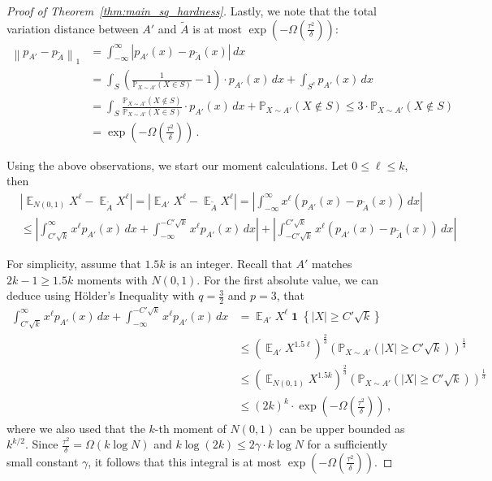 \documentclass{theoretics}
\newcommand{\paren}[1]{(#1)}
\newcommand{\Paren}[1]{\left(#1\right)}
\newcommand{\Abs}[1]{\left\lvert#1\right\rvert}
\newcommand{\Set}[1]{\left\{#1\right\}}
\newcommand{\Norm}[1]{\left\lVert#1\right\rVert}
\newcommand{\Esymb}{\mathbb{E}}
\newcommand{\Psymb}{\mathbb{P}}
\DeclareMathOperator*{\E}{\Esymb}
\DeclareMathOperator{\Ind}{\mathbf 1}
\renewcommand{\leq}{\leqslant}
\renewcommand{\geq}{\geqslant}
\begin{document}
\begin{proof}[Proof of Theorem~\ref{thm:main_sq_hardness}]
    Lastly, we note that the total variation distance between $A'$ and $\tilde{A}$ is at most $\exp(-\Omega(\tfrac{\tau^2}\delta))$:
    \begin{align*}
        \Norm{p_{A'} - p_{\tilde{A}}}_1 &= \int_{-\infty}^\infty \Abs{p_{A'}(x) - p_{\tilde{A}}(x)} \, dx \\
        &= \int_S \Paren{\frac 1 {\Psymb_{X \sim A'}(X \in S)} - 1} \cdot p_{A'}(x) \, dx + \int_{S^c} p_{A'}(x) \, dx \\
        &= \int_S \frac {\Psymb_{X \sim A'}(X \not\in S)} {\Psymb_{X \sim A'}(X \in S)} \cdot p_{A'}(x) \, dx + \Psymb_{X \sim A'}(X \not\in S) \leq 3\cdot\Psymb_{X \sim A'}(X \not\in S)  \\
        &= \exp\Paren{-\Omega\Paren{\frac{\tau^2} \delta}} \,.
    \end{align*}
    
    Using the above observations, we start our moment calculations.
    Let $0 \leq \ell \leq k$, then
    \begin{align*}
        &\Abs{\E_{N(0,1)} X^\ell - \E_{\tilde{A}} X^\ell} = \Abs{\E_{A'} X^\ell - \E_{\tilde{A}} X^\ell} = \Abs{\int_{-\infty}^\infty x^\ell (p_{A'}(x) - p_{\tilde{A}}(x)) \, dx} \\
        &\leq \Abs{\int_{C'\sqrt{k}}^{\infty} x^\ell p_{A'}(x) \, dx + \int_{-\infty}^{-C'\sqrt{k}} x^\ell p_{A'}(x) \, dx} + \Abs{\int_{-C'\sqrt{k}}^{C'\sqrt{k}} x^\ell (p_{A'}(x) - p_{\tilde{A}}(x)) \, dx} 
    \end{align*}

    For simplicity, assume that $1.5 k$ is an integer.
    Recall that $A'$ matches $2k-1 \geq 1.5 k$ moments with $N(0,1)$. 
    For the first absolute value, we can deduce using H\"older's Inequality with $q = \tfrac 3 2$ and $p = 3$, that
    \begin{align*}
        \int_{C'\sqrt{k}}^{\infty} x^\ell p_{A'}(x) \, dx + \int_{-\infty}^{-C'\sqrt{k}} x^\ell p_{A'}(x) \, dx &= \E_{A'} X^\ell \Ind\Set{\Abs{X} \geq C' \sqrt{k}} \\
        &\leq \Paren{\E_{A'} X^{1.5\ell}}^{\tfrac 2 3} \Paren{\Psymb_{X \sim A'}\Paren{\Abs{X} \geq C' \sqrt{k}}}^{\tfrac 1 3} \\
        &\leq \Paren{\E_{N(0,1)} X^{1.5k}}^{\tfrac 2 3} \Paren{\Psymb_{X \sim A'}\Paren{\Abs{X} \geq C' \sqrt{k}}}^{\tfrac 1 3} \\
        &\leq (2k)^{k} \cdot \exp\Paren{-\Omega\Paren{\frac{\tau^2}{\delta}}} \,,
    \end{align*}
    where we also used that the $k$-th moment of $N(0,1)$ can be upper bounded as $k^{k/2}$.
    Since $\tfrac{\tau^2}{\delta} = \Omega( k \log N )$ and $k \log (2k) \leq 2\gamma \cdot k \log N$ for a sufficiently small constant $\gamma$, it follows that this integral is at most $\exp\paren{-\Omega\paren{\tfrac{\tau^2}{\delta}}}$.
    

\end{proof}
\end{document}
